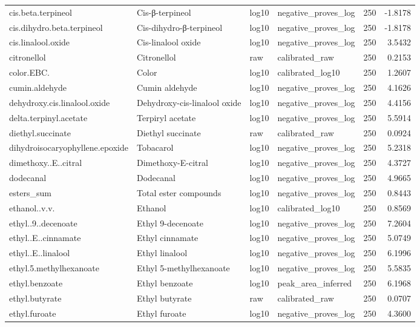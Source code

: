 {\begin{longtable}{llllrr}
cis.beta.terpineol & Cis-β-terpineol & log10 & negative\_proves\_log & 250 & -1.8178 \\
cis.dihydro.beta.terpineol & Cis-dihydro-β-terpineol & log10 & negative\_proves\_log & 250 & -1.8178 \\
cis.linalool.oxide & Cis-linalool oxide & log10 & negative\_proves\_log & 250 & 3.5432 \\
citronellol & Citronellol & raw & calibrated\_raw & 250 & 0.2153 \\
color.EBC. & Color & log10 & calibrated\_log10 & 250 & 1.2607 \\
cumin.aldehyde & Cumin aldehyde & log10 & negative\_proves\_log & 250 & 4.1626 \\
dehydroxy.cis.linalool.oxide & Dehydroxy-cis-linalool oxide & log10 & negative\_proves\_log & 250 & 4.4156 \\
delta.terpinyl.acetate & Terpiryl acetate & log10 & negative\_proves\_log & 250 & 5.5914 \\
diethyl.succinate & Diethyl succinate & raw & calibrated\_raw & 250 & 0.0924 \\
dihydroisocaryophyllene.epoxide & Tobacarol & log10 & negative\_proves\_log & 250 & 5.2318 \\
dimethoxy..E..citral & Dimethoxy-E-citral & log10 & negative\_proves\_log & 250 & 4.3727 \\
dodecanal & Dodecanal & log10 & negative\_proves\_log & 250 & 4.9665 \\
esters\_sum & Total ester compounds & log10 & negative\_proves\_log & 250 & 0.8443 \\
ethanol..v.v. & Ethanol & log10 & calibrated\_log10 & 250 & 0.8569 \\
ethyl..9..decenoate & Ethyl 9-decenoate & log10 & negative\_proves\_log & 250 & 7.2604 \\
ethyl..E..cinnamate & Ethyl cinnamate & log10 & negative\_proves\_log & 250 & 5.0749 \\
ethyl..E..linalool & Ethyl linalool & log10 & negative\_proves\_log & 250 & 6.1996 \\
ethyl.5.methylhexanoate & Ethyl 5-methylhexanoate & log10 & negative\_proves\_log & 250 & 5.5835 \\
ethyl.benzoate & Ethyl benzoate & log10 & peak\_area\_inferred & 250 & 6.1968 \\
ethyl.butyrate & Ethyl butyrate & raw & calibrated\_raw & 250 & 0.0707 \\
ethyl.furoate & Ethyl furoate & log10 & negative\_proves\_log & 250 & 4.3600 \\

\end{longtable}}

